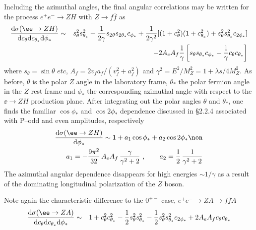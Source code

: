 Including the azimuthal angles, the final angular correlations may be written
for the process $e^+e^- \rightarrow  ZH$ with $Z\rightarrow  f \bar{f}$ as
\cite{Bargeretal}
\begin{eqnarray}
\frac{ {\rm d}\sigma (\ee \to ZH)} { {\rm d} c_\theta {\rm d} c_{\theta_*}
{\rm d} \phi_*} &\sim & s^2_\theta s^2_{\theta_*} -\frac{1}{2 \gamma} s_{2
\theta} s_{2\theta_*} c_{\phi_*} + \frac{1}{2\gamma^2} [(1+c^2_\theta)(1
+c^2_{\theta_*})+s^2_\theta s^2_{\theta_*} c_{2\phi_*} ] \nonumber \\
&&- 2A_e A_f\frac{1}{\gamma} \left[ s_\theta s_{\theta_*} c_{\phi_*} -
\frac{1}{\gamma} c_\theta c_{\theta_*} \right]
\end{eqnarray}
where $s_\theta= \sin \theta$ $etc$, $A_f=2v_fa_f/(v_f^2+a_f^2)$ and $\gamma^2
=E^2/M_Z^2= 1+ \lambda s/4M_Z^2$. As before, $\theta$ is the polar $Z$ angle 
in the laboratory frame, $\theta_*$ the polar fermion angle in the $Z$ rest 
frame and $\phi_*$ the corresponding azimuthal angle with respect to the 
$\ee \to ZH$ production plane. After integrating out the polar angles 
$\theta$ and $\theta_*$, one finds the familiar $\cos \phi_*$ and $\cos 2 
\phi_*$ dependence discussed in \S2.2.4 associated with P--odd and even 
amplitudes, respectively
\begin{eqnarray}
\frac{ {\rm d}\sigma (\ee \to ZH)} { {\rm d} \phi_*} \sim 1+a_1 \cos \phi_*
+ a_2 \cos 2\phi_* \non \\
a_1= -\frac{9\pi^2}{32}\, A_e A_f\, \frac{\gamma}{\gamma^2+2}\, \, 
,\qquad a_2= \frac{1}{2}\,\frac{1}{\gamma^2+2}
\end{eqnarray}
The azimuthal angular dependence disappears for high energies $\sim 1/\gamma$
as a result of the dominating longitudinal polarization of the $Z$ boson.\s

Note again the characteristic difference to the $0^{+-}$ case, 
$e^+e^- \rightarrow  ZA \to f\bar{f} A$ \cite{Bargeretal,CP-full}
\begin{eqnarray}
\frac{ {\rm d} \sigma (\ee \to ZA)} { {\rm d} c_\theta {\rm d} c_{\theta_*}
{\rm d} \phi_*} &\sim & 1+ c^2_\theta c^2_{\theta_*} -\frac{1}{2}
s^2_\theta s^2_{\theta_*} -\frac{1}{2} s^2_\theta s^2_{\theta_* }
c_{2\phi_*} + 2 A_e A_f c_\theta c_{\theta_*}
 \end{eqnarray}

